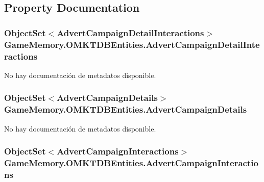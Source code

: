 \subsection{Property Documentation}
\hypertarget{class_game_memory_1_1_o_m_k_t_d_b_entities_a4e2a832b8278305d10261301f9bcad39}{
\subsubsection[{Advert\-Campaign\-Detail\-Interactions}]{\setlength{\rightskip}{0pt plus 5cm}Object\-Set$<${\bf Advert\-Campaign\-Detail\-Interactions}$>$ Game\-Memory.\-O\-M\-K\-T\-D\-B\-Entities.\-Advert\-Campaign\-Detail\-Interactions\hspace{0.3cm}{\ttfamily [get]}}}\label{class_game_memory_1_1_o_m_k_t_d_b_entities_a4e2a832b8278305d10261301f9bcad39}


No hay documentación de metadatos disponible. 

\hypertarget{class_game_memory_1_1_o_m_k_t_d_b_entities_a0ad54bc426e92a5a9d6034d017f007bc}{
\subsubsection[{Advert\-Campaign\-Details}]{\setlength{\rightskip}{0pt plus 5cm}Object\-Set$<${\bf Advert\-Campaign\-Details}$>$ Game\-Memory.\-O\-M\-K\-T\-D\-B\-Entities.\-Advert\-Campaign\-Details\hspace{0.3cm}{\ttfamily [get]}}}\label{class_game_memory_1_1_o_m_k_t_d_b_entities_a0ad54bc426e92a5a9d6034d017f007bc}


No hay documentación de metadatos disponible. 

\hypertarget{class_game_memory_1_1_o_m_k_t_d_b_entities_a4eb106967b73c6bfbe86b6f91a008829}{
\subsubsection[{Advert\-Campaign\-Interactions}]{\setlength{\rightskip}{0pt plus 5cm}Object\-Set$<${\bf Advert\-Campaign\-Interactions}$>$ Game\-Memory.\-O\-M\-K\-T\-D\-B\-Entities.\-Advert\-Campaign\-Interactions\hspace{0.3cm}{\ttfamily [get]}}}\label{class_game_memory_1_1_o_m_k_t_d_b_entities_a4eb106967b73c6bfbe86b6f91a008829}


